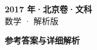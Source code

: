 \documentclass[zihao=-4, a4paper]{ctexart}
\begin{document}
\begin{center}
  {\Large\bfseries 2017 年·北京卷·文科}\\[4pt]
  {\large 数学 · 解析版}
\end{center}
\medskip
{}

\clearpage
{}
\begin{center}{\Large\bfseries 参考答案与详细解析}\end{center}
\medskip

\end{document}
